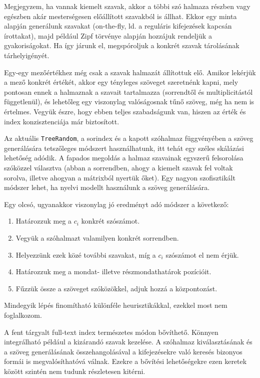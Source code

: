 \documentclass[
    parspace,
    noindent,
    nohyp,
]{elteiktdk}[2023/04/10]
\begin{document}
Megjegyzem, ha vannak kiemelt szavak, akkor a többi szó halmaza részben vagy egészben
akár mesterségesen előállított szavakból is állhat.
Ekkor egy minta alapján generálunk szavakat
(on-the-fly, ld. a reguláris kifejezések kapcsán írottakat),
majd például Zipf törvénye alapján hozzájuk rendeljük a gyakoriságokat.
Ha így járunk el, megspóroljuk a konkrét szavak tárolásának tárhelyigényét.

Egy-egy mezőértékhez még csak a szavak halmazát állítottuk elő.
Amikor lekérjük a mező konkrét értékét, akkor egy tényleges szöveget szeretnénk kapni,
mely pontosan ennek a halmaznak a szavait tartalmazza (sorrendtől és multiplicitástól függetlenül),
és lehetőleg egy viszonylag valóságosnak tűnő szöveg, még ha nem is értelmes.
Vegyük észre, hogy ebben teljes szabadságunk van, hiszen az érték és index konzisztenciája már biztosított.

Az aktuális \texttt{TreeRandom}, a sorindex és a kapott szóhalmaz függvényében
a szöveg generálására tetszőleges módszert használhatunk,
itt tehát egy széles skálázási lehetőség adódik.
A fapados megoldás a halmaz szavainak egyszerű felsorolása szóközzel választva
(abban a sorrendben, ahogy a kiemelt szavak fel voltak sorolva, illetve ahogyan a mátrixból nyertük őket).
Egy nagyon szofisztikált módszer lehet, ha nyelvi modellt használunk a szöveg generálására.

Egy olcsó, ugyanakkor viszonylag jó eredményt adó módszer a következő:

\begin{enumerate}
    \item Határozzuk meg a $c_i$ konkrét szószámot.
    \item Vegyük a szóhalmazt valamilyen konkrét sorrendben.
    \item Helyezzünk ezek közé további szavakat, míg a $c_i$ szószámot el nem érjük.
    \item Határozzuk meg a mondat- illetve részmondathatárok pozícióit.
    \item Fűzzük össze a szöveget szóközökkel, adjuk hozzá a központozást.
\end{enumerate}

Mindegyik lépés finomítható különféle heurisztikákkal,
ezekkel most nem foglalkozom.

A fent tárgyalt full-text index természetes módon bővíthető.
Könnyen integrálható például a kizárandó szavak kezelése.
A szóhalmaz kiválasztásának és a szöveg generálásának összehangolásával
a kifejezésekre való keresés bizonyos formái is megvalósíthatóvá válnak.
Ezekre a bővítési lehetőségekre ezen keretek között szintén nem tudunk részletesen kitérni.
\end{document}
